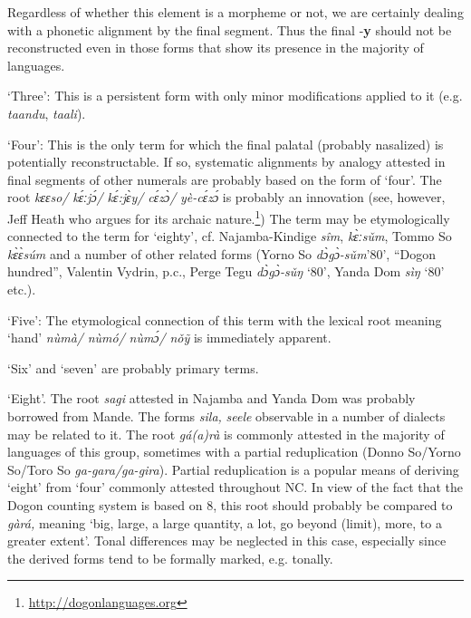 Regardless of whether this element is a morpheme or not, we are certainly dealing with a phonetic alignment by the final segment. Thus the final -\textbf{y} should not be reconstructed even in those forms that show its presence in the majority of languages. 

‘Three’: This is a persistent form with only minor modifications applied to it (e.g. \textit{taandu}, \textit{taali}). 

‘Four’: This is the only term for which the final palatal (probably nasalized) is potentially reconstructable. If so, systematic alignments by analogy attested in final segments of other numerals are probably based on the form of ‘four’. The root \textit{kɛɛso/} \textit{k{\'{ɛ}}ːj{\'{ɔ}}/} \textit{k{\'{ɛ}}:j{\`{ɛ}}y/} \textit{c{\'{ɛ}}z{\`{ɔ}}/} \textit{yè-c{\'{ɛ}}z{\'{ɔ}}} is probably an innovation (see, however, Jeff Heath who argues for its archaic nature.\footnote{\url{http://dogonlanguages.org}}) The term may be etymologically connected to the term for ‘eighty’, cf. Najamba-Kindige \textit{s{\^{i}}m}, \textit{k{\`{ɛ}}ːs{\v{u}}m}, Tommo So \textit{k{\`{ɛ}}{\`{ɛ}}súm} and a number of other related forms (Yorno So \textit{d{\`{ɔ}}g{\`{ɔ}}-s{\v{u}}m}’80’, “Dogon hundred”, Valentin Vydrin, p.c., Perge Tegu \textit{d{\`{ɔ}}g{\`{ɔ}}-s{\v{u}}ŋ} ‘80’, Yanda Dom \textit{sìŋ} ‘80’ etc.).

‘Five’: The etymological connection of this term with the lexical root meaning ‘hand’ \textit{n{\`{u}}mà/} \textit{n{\`{u}}mó/} \textit{n{\`{u}}m{\'{ɔ}}/} \textit{n{\v{o}}{\~{y}}} is immediately apparent.

‘Six’ and ‘seven’ are probably primary terms. 

‘Eight’. The root \textit{sagi} attested in Najamba and Yanda Dom was probably borrowed from Mande. The forms \textit{sila,} \textit{seele} observable in a number of dialects may be related to it. The root  \textit{gá(a)rà} is commonly attested in the majority of languages of this group, sometimes with a partial reduplication (Donno So/Yorno So/Toro So \textit{ga-gara/ga-gira}). Partial reduplication is a popular means of deriving ‘eight’ from ‘four’ commonly attested throughout NC. In view of the fact that the Dogon counting system is based on 8, this root should probably be compared to \textit{gàrá,} meaning ‘big, large, a large quantity, a lot, go beyond (limit), more, to a greater extent’. Tonal differences may be neglected in this case, especially since the derived forms tend to be formally marked, e.g. tonally.

